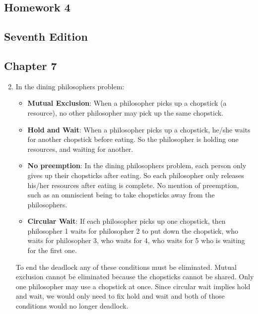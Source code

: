 \documentclass{article}
\begin{document}
\begin{center}
    \section*{Homework 4}
    \subsection*{Seventh Edition}
\end{center}

\subsection*{Chapter 7}
\begin{enumerate}
\setcounter{enumi}{1}
\item In the dining philosophers problem:
\begin{itemize}
\item \textbf{Mutual Exclusion}: When a philosopher picks up a chopstick (a resource), no other philosopher may pick up the same chopstick.
\item \textbf{Hold and Wait}: When a philosopher picks up a chopstick, he/she waits for another chopstick before eating. So the philosopher is holding one resources, and waiting for another.
\item \textbf{No preemption}: In the dining philosophers problem, each person only gives up their chopsticks after eating. So each philosopher only releases his/her resources after eating is complete. No mention of preemption, such as an omniscient being to take chopsticks away from the philosophers.
\item \textbf{Circular Wait}: If each philosopher picks up one chopstick, then philosopher 1 waits for philosopher 2 to put down the chopstick, who waits for philosopher 3, who waits for 4, who waits for 5 who is waiting for the first one.
\end{itemize}
To end the deadlock any of these conditions must be eliminated.
Mutual exclusion cannot be eliminated because the chopsticks cannot be shared. Only one philosopher may use a chopstick at once.
Since circular wait implies hold and wait, we would only need to fix hold and wait and both of those conditions would no longer deadlock.

\end{enumerate}
\end{document}
